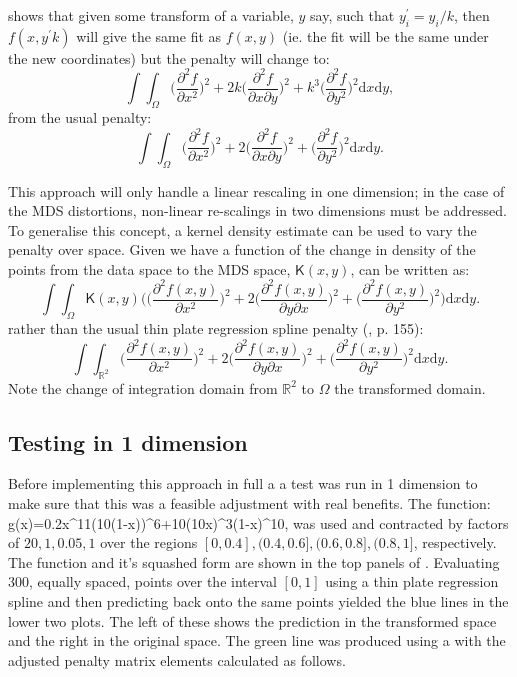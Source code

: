\cite{wood2000} shows that given some transform of a variable, $y$ say, such that $y_i^\prime=y_i/k$, then $f(x,y^\prime k)$ will give the same fit as $f(x,y)$ (ie. the fit will be the same under the new coordinates) but the penalty will change to:
\begin{equation}
\int\int_\Omega \Big( \frac{\partial^2 f}{\partial x^2} \Big)^2 + 2k\Big( \frac{\partial^2 f}{\partial x \partial y} \Big)^2 + k^3\Big( \frac{\partial^2 f}{\partial y^2} \Big)^2 \text{d}x \text{d}y,
\label{adjustedintegral}
\end{equation}
from the usual penalty:
\begin{equation*}
\int\int_\Omega \Big( \frac{\partial^2 f}{\partial x^2} \Big)^2 + 2\Big( \frac{\partial^2 f}{\partial x \partial y} \Big)^2 + \Big( \frac{\partial^2 f}{\partial y^2} \Big)^2 \text{d}x \text{d}y.
\end{equation*}

This approach will only handle a linear rescaling in one dimension; in the case of the MDS distortions, non-linear re-scalings in two dimensions must be addressed. To generalise this concept, a kernel density estimate can be used to vary the penalty over space. Given we have a function of the change in density of the points from the data space to the MDS space, $\mathsf{K}(x,y)$,  can be written as:
\begin{equation}
\int\int_\Omega \mathsf{K}(x,y) \Big( \Big(\frac{\partial^2 f(x,y)}{\partial x^2}\Big)^2 + 2\Big(\frac{\partial^2 f(x,y)}{\partial y \partial x}\Big)^2 + \Big(\frac{\partial^2 f(x,y)}{\partial y^2}\Big)^2\Big) \text{d}x\text{d}y.
\label{kdeadjust}
\end{equation}
rather than the usual thin plate regression spline penalty (\cite{simonbook}, p. 155):
\begin{equation}
\int\int_{\mathbb{R}^2} \Big(\frac{\partial^2 f(x,y)}{\partial x^2}\Big)^2 + 2\Big(\frac{\partial^2 f(x,y)}{\partial y \partial x}\Big)^2 + \Big(\frac{\partial^2 f(x,y)}{\partial y^2}\Big)^2 \text{d}x\text{d}y.
\end{equation}
Note the change of integration domain from $\mathbb{R}^2$ to $\Omega$ the transformed domain.

\subsection{Testing in 1 dimension}

Before implementing this approach in full a a test was run in 1 dimension to make sure that this was a feasible adjustment with real benefits. The function:
\be
g(x)=0.2x^{11}(10(1-x))^6+10(10x)^3(1-x)^{10},
\ee
was used and contracted by factors of $20,1,0.05,1$ over the regions $[0,0.4], (0.4,0.6],(0.6,0.8],(0.8,1]$, respectively. The function and it's squashed form are shown in the top panels of . Evaluating 300, equally spaced, points over the interval $[0,1]$ using a thin plate regression spline and then predicting back onto the same points yielded the blue lines in the lower two plots. The left of these shows the prediction in the transformed space and the right in the original space. The green line was produced using a \tprs with the adjusted penalty matrix elements calculated as follows.

